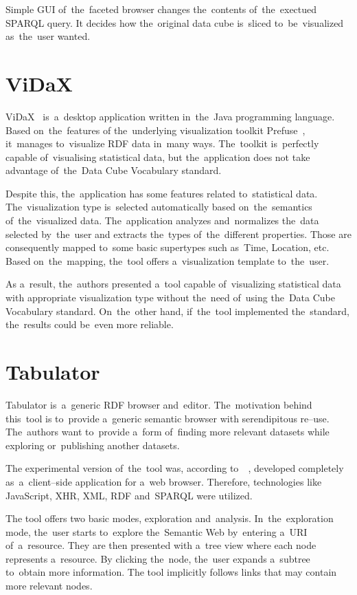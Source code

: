 Simple GUI of~the~faceted browser changes the~contents of~the~exectued SPARQL query. 
It decides how the~original data cube is~sliced to~be~visualized as~the~user 
wanted.

\section{ViDaX}
ViDaX~\cite{vidax} is~a~desktop application written in~the~Java programming language. Based on~the~features
of the~underlying visualization toolkit Prefuse~\cite{prefuse}, it~manages to~visualize RDF data in~many ways. The~toolkit is~perfectly capable of~visualising statistical data, but the~application does not take advantage of~the~Data Cube Vocabulary standard.

Despite this, the~application has some features related to~statistical 
data. The~visualization type is~selected automatically based on~the~semantics of~the~visualized data. The~application analyzes and~normalizes the~data selected by~the~user 
and extracts the~types of~the~different properties. Those are consequently mapped to~some basic supertypes such as~Time, Location, etc. Based on~the~mapping,
the~tool offers a~visualization template to~the~user.

As a~result, the~authors presented a~tool capable of~visualizing 
statistical data with appropriate visualization type without the~need of~using 
the~Data Cube Vocabulary standard. On~the~other hand, if~the~tool 
implemented the~standard, the~results could be~even more reliable.

\section{Tabulator}
\label{sec:rw:tabulator}
Tabulator is~a~generic RDF browser and~editor. The~motivation behind this~tool
is to~provide a~generic semantic browser with serendipitous re--use. The~authors 
want to~provide a~form of~finding more relevant datasets while exploring or~publishing another datasets. 

The experimental version of~the~tool was, according to~~\cite{tabulator-paper}, 
developed completely as~a~client--side application for a~web browser. Therefore, 
technologies like JavaScript, XHR, XML, RDF and~SPARQL were utilized.

The tool offers two basic modes, exploration and~analysis. In~the~exploration mode,
the~user starts to~explore the~Semantic Web by~entering a~URI of~a~resource. They 
are then presented with a~tree view where each node represents a~resource. 
By clicking the~node, the~user expands a~subtree to~obtain more information.
The tool implicitly follows links that may contain more relevant nodes.

